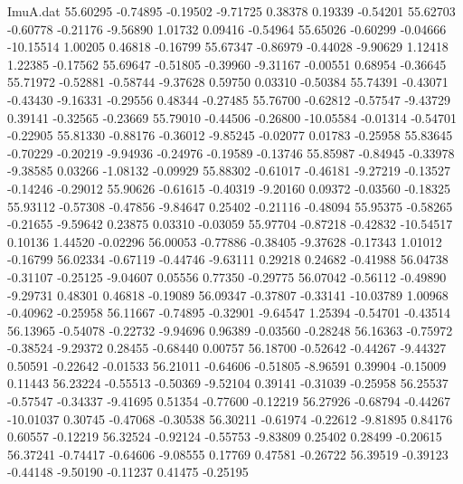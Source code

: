 \begin{filecontents}{ImuA.dat}
  55.60295   -0.74895   -0.19502   -9.71725    0.38378    0.19339   -0.54201
  55.62703   -0.60778   -0.21176   -9.56890    1.01732    0.09416   -0.54964
  55.65026   -0.60299   -0.04666  -10.15514    1.00205    0.46818   -0.16799
  55.67347   -0.86979   -0.44028   -9.90629    1.12418    1.22385   -0.17562
  55.69647   -0.51805   -0.39960   -9.31167   -0.00551    0.68954   -0.36645
  55.71972   -0.52881   -0.58744   -9.37628    0.59750    0.03310   -0.50384
  55.74391   -0.43071   -0.43430   -9.16331   -0.29556    0.48344   -0.27485
  55.76700   -0.62812   -0.57547   -9.43729    0.39141   -0.32565   -0.23669
  55.79010   -0.44506   -0.26800  -10.05584   -0.01314   -0.54701   -0.22905
  55.81330   -0.88176   -0.36012   -9.85245   -0.02077    0.01783   -0.25958
  55.83645   -0.70229   -0.20219   -9.94936   -0.24976   -0.19589   -0.13746
  55.85987   -0.84945   -0.33978   -9.38585    0.03266   -1.08132   -0.09929
  55.88302   -0.61017   -0.46181   -9.27219   -0.13527   -0.14246   -0.29012
  55.90626   -0.61615   -0.40319   -9.20160    0.09372   -0.03560   -0.18325
  55.93112   -0.57308   -0.47856   -9.84647    0.25402   -0.21116   -0.48094
  55.95375   -0.58265   -0.21655   -9.59642    0.23875    0.03310   -0.03059
  55.97704   -0.87218   -0.42832  -10.54517    0.10136    1.44520   -0.02296
  56.00053   -0.77886   -0.38405   -9.37628   -0.17343    1.01012   -0.16799
  56.02334   -0.67119   -0.44746   -9.63111    0.29218    0.24682   -0.41988
  56.04738   -0.31107   -0.25125   -9.04607    0.05556    0.77350   -0.29775
  56.07042   -0.56112   -0.49890   -9.29731    0.48301    0.46818   -0.19089
  56.09347   -0.37807   -0.33141  -10.03789    1.00968   -0.40962   -0.25958
  56.11667   -0.74895   -0.32901   -9.64547    1.25394   -0.54701   -0.43514
  56.13965   -0.54078   -0.22732   -9.94696    0.96389   -0.03560   -0.28248
  56.16363   -0.75972   -0.38524   -9.29372    0.28455   -0.68440    0.00757
  56.18700   -0.52642   -0.44267   -9.44327    0.50591   -0.22642   -0.01533
  56.21011   -0.64606   -0.51805   -8.96591    0.39904   -0.15009    0.11443
  56.23224   -0.55513   -0.50369   -9.52104    0.39141   -0.31039   -0.25958
  56.25537   -0.57547   -0.34337   -9.41695    0.51354   -0.77600   -0.12219
  56.27926   -0.68794   -0.44267  -10.01037    0.30745   -0.47068   -0.30538
  56.30211   -0.61974   -0.22612   -9.81895    0.84176    0.60557   -0.12219
  56.32524   -0.92124   -0.55753   -9.83809    0.25402    0.28499   -0.20615
  56.37241   -0.74417   -0.64606   -9.08555    0.17769    0.47581   -0.26722
  56.39519   -0.39123   -0.44148   -9.50190   -0.11237    0.41475   -0.25195

\end{filecontents}
